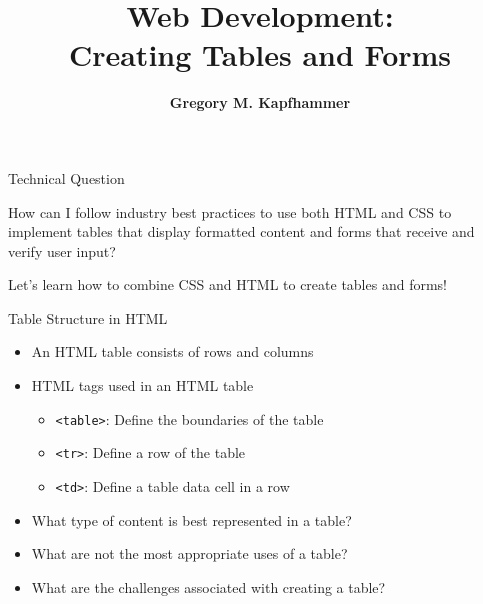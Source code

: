 \documentclass[14pt,aspectratio=169]{beamer}
\title{Web Development: \\ Creating Tables and Forms}
\author{{\bf Gregory M. Kapfhammer}}
\institute[shortinst]{{\bf Department of Computer Science, Allegheny College}}
\begin{document}
{
  \begin{frame}
    \titlepage
  \end{frame}
}

%
\begin{frame}{Technical Question}
  \hspace*{.25in}
  \vspace*{.1in}
  \begin{minipage}{4.5in}
  \begin{center}
    {\large How can I follow industry best practices to use both HTML and CSS to
    implement tables that display formatted content and forms that receive and
  verify user input?}
  \end{center}
  \end{minipage}
  \vspace{2ex}
  \begin{center}
    \small Let's learn how to combine CSS and HTML to create tables and forms!
  \end{center}
\end{frame}

%
\begin{frame}{Table Structure in HTML}
  \begin{itemize}
    \item An HTML table consists of rows and columns
      \vspace*{-.1in}
    \item HTML tags used in an HTML table
      \begin{itemize}
        \item {\tt <table>}: Define the boundaries of the table
        \item {\tt <tr>}: Define a row of the table
        \item {\tt <td>}: Define a table data cell in a row
      \end{itemize}
      \vspace*{-.2in}
    \item What type of content is best represented in a table?

      \vspace*{-.2in}
    \item What are not the most appropriate uses of a table?
      \vspace*{-.2in}
    \item What are the challenges associated with creating a table?
  \end{itemize}
\end{frame}
\end{document}
